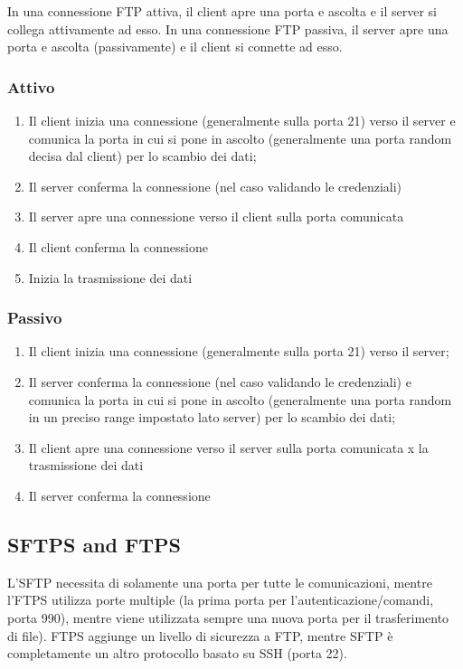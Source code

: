 \documentclass{article}
\begin{document}
In una connessione FTP attiva, il client apre una porta e ascolta
e il server si collega attivamente ad esso.
In una connessione FTP passiva, il server apre una porta e ascolta
(passivamente) e il client si connette ad esso. 

\subsubsection{Attivo}

\begin{enumerate}
    \item Il client inizia una connessione (generalmente sulla porta 21) verso il server e comunica la porta in cui si pone in ascolto (generalmente una porta random decisa dal client) per lo scambio dei dati;
    \item Il server conferma la connessione (nel caso validando le credenziali)
    \item Il server apre una connessione verso il client sulla porta comunicata
    \item Il client conferma la connessione
    \item Inizia la trasmissione dei dati
\end{enumerate}

\subsubsection{Passivo}

\begin{enumerate}
    \item Il client inizia una connessione (generalmente sulla porta 21) verso il server;
    \item Il server conferma la connessione (nel caso validando le credenziali) e comunica la porta in cui si pone in ascolto (generalmente una porta random in un preciso range impostato lato server) per lo scambio dei dati;
    \item Il client apre una connessione verso il server sulla porta comunicata x la trasmissione dei dati
    \item Il server conferma la connessione
\end{enumerate}

\subsection{SFTPS and FTPS}

L’SFTP necessita di solamente una porta per tutte le comunicazioni, mentre l’FTPS utilizza porte multiple (la prima porta per l’autenticazione/comandi, porta 990), mentre viene utilizzata sempre una nuova porta per il trasferimento di file).
FTPS aggiunge un livello di sicurezza a FTP, mentre SFTP è completamente un altro protocollo basato su SSH (porta 22).
\end{document}
